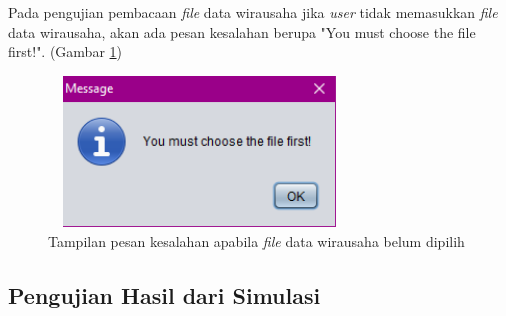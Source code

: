Pada pengujian pembacaan \textit{file} data wirausaha jika \textit{user} tidak memasukkan \textit{file} data wirausaha, akan ada pesan kesalahan berupa "You must choose the file first!". (Gambar \ref{pesanError6})

	\begin{figure} [H]
	\centering  
	\includegraphics[width=8cm, height=4cm]{pesanError6} 
		\caption[Tampilan pesan kesalahan apabila \textit{file} data wirausaha belum dipilih]{Tampilan pesan kesalahan apabila \textit{file} data wirausaha belum dipilih}
	\label{pesanError6} 
\end{figure}

 
\subsection{Pengujian Hasil dari Simulasi}

